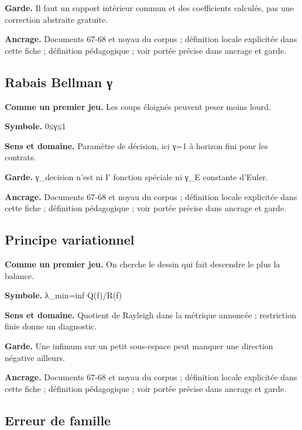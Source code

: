 \documentclass[
  9pt,
  a4paper,
]{article}
\begin{document}
\textbf{Garde.} Il faut un support intérieur commun et des coefficients
calculés, pas une correction abstraite gratuite.

\textbf{Ancrage.} Documents 67-68 et noyau du corpus ; définition locale
explicitée dans cette fiche ; définition pédagogique ; voir portée
précise dans ancrage et garde.

\hypertarget{rabais-bellman-ux3b3}{%
\subsection{Rabais Bellman γ}\label{rabais-bellman-ux3b3}}

\textbf{Comme un premier jeu.} Les coups éloignés peuvent peser moins
lourd.

\textbf{Symbole.} 0≤γ≤1

\textbf{Sens et domaine.} Paramètre de décision, ici γ=1 à horizon fini
pour les contrats.

\textbf{Garde.} γ\_decision n'est ni Γ fonction spéciale ni γ\_E
constante d'Euler.

\textbf{Ancrage.} Documents 67-68 et noyau du corpus ; définition locale
explicitée dans cette fiche ; définition pédagogique ; voir portée
précise dans ancrage et garde.

\hypertarget{principe-variationnel}{%
\subsection{Principe variationnel}\label{principe-variationnel}}

\textbf{Comme un premier jeu.} On cherche le dessin qui fait descendre
le plus la balance.

\textbf{Symbole.} λ\_min=inf Q(f)/R(f)

\textbf{Sens et domaine.} Quotient de Rayleigh dans la métrique annoncée
; restriction finie donne un diagnostic.

\textbf{Garde.} Une infimum sur un petit sous-espace peut manquer une
direction négative ailleurs.

\textbf{Ancrage.} Documents 67-68 et noyau du corpus ; définition locale
explicitée dans cette fiche ; définition pédagogique ; voir portée
précise dans ancrage et garde.

\hypertarget{erreur-de-famille}{%
\subsection{Erreur de famille}\label{erreur-de-famille}}
\end{document}
